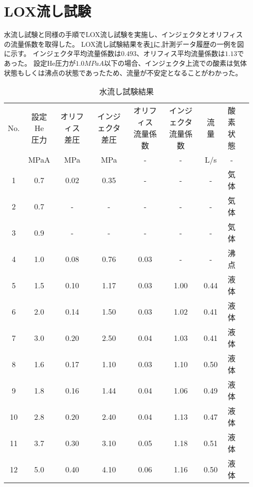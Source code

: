 \section{LOX流し試験}
水流し試験と同様の手順でLOX流し試験を実施し、インジェクタとオリフィスの流量係数を取得した。
LOX流し試験結果を表\ref{tab:LOX}に,計測データ履歴の一例を図に示す。
インジェクタ平均流量係数は$0.493$、オリフィス平均流量係数は$1.13$であった。
設定He圧力が$1.0MPaA$以下の場合、インジェクタ上流での酸素は気体状態もしくは沸点の状態であったため、流量が不安定となることがわかった。


\begin{table}[htb]
\begin{center}
\caption{水流し試験結果}
\small
\begin{tabular}{|c|c|c|c|c|c|c|c|c|} \hline
No. & \shortstack{設定He\\圧力} & \shortstack{オリフィス\\差圧} & \shortstack{インジェクタ\\差圧} & \shortstack{オリフィス\\流量係数} & \shortstack{インジェクタ\\流量係数} & 流量 & \shortstack{酸素\\状態}  \\ \cline{2-8}
 & MPaA & MPa & MPa & - & - & L/s & - \\ \hline
1 & 0.7 & 0.02 & 0.35 & - & - & - & 気体 \\ \hline
2 & 0.7 & - & - & - & - & - & 気体 \\ \hline
3 & 0.9 & - & - & - & - & - & 気体 \\ \hline
4 & 1.0 & 0.08 & 0.76 & 0.03 & - & - & 沸点 \\ \hline
5 & 1.5 & 0.10 & 1.17 & 0.03 & 1.00 & 0.44 & 液体 \\ \hline
6 & 2.0 & 0.14 & 1.50 & 0.03 & 1.02 & 0.41 & 液体 \\ \hline
7 & 3.0 & 0.20 & 2.50 & 0.04 & 1.03 & 0.41 & 液体 \\ \hline
8 & 1.6 & 0.17 & 1.10 & 0.03 & 1.10 & 0.50 & 液体 \\ \hline
9 & 1.8 & 0.16 & 1.44 & 0.04 & 1.06 & 0.49 & 液体 \\ \hline
10 & 2.8 & 0.20 & 2.40 & 0.04 & 1.13 & 0.47 & 液体 \\ \hline
11 & 3.7 & 0.30 & 3.10 & 0.05 & 1.18 & 0.51 & 液体 \\ \hline
12 & 5.0 & 0.40 & 4.10 & 0.06 & 1.16 & 0.50 & 液体 \\ \hline
\end{tabular}
\label{tab:LOX}
\end{center}
\end{table}
